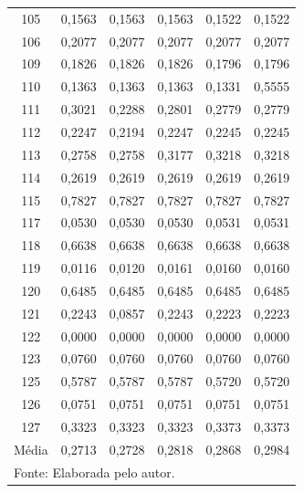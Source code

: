 \begin{center}
\begin{longtable}{c|r|r|r|r|r}
105 & 0,1563 & 0,1563 & 0,1563 & 0,1522 & 0,1522 \\

106 & 0,2077 & 0,2077 & 0,2077 & 0,2077 & 0,2077 \\

109 & 0,1826 & 0,1826 & 0,1826 & 0,1796 & 0,1796 \\

110 & 0,1363 & 0,1363 & 0,1363 & 0,1331 & 0,5555 \\

111 & 0,3021 & 0,2288 & 0,2801 & 0,2779 & 0,2779 \\

112 & 0,2247 & 0,2194 & 0,2247 & 0,2245 & 0,2245 \\

113 & 0,2758 & 0,2758 & 0,3177 & 0,3218 & 0,3218 \\

114 & 0,2619 & 0,2619 & 0,2619 & 0,2619 & 0,2619 \\

115 & 0,7827 & 0,7827 & 0,7827 & 0,7827 & 0,7827 \\

117 & 0,0530 & 0,0530 & 0,0530 & 0,0531 & 0,0531 \\

118 & 0,6638 & 0,6638 & 0,6638 & 0,6638 & 0,6638 \\

119 & 0,0116 & 0,0120 & 0,0161 & 0,0160 & 0,0160 \\

120 & 0,6485 & 0,6485 & 0,6485 & 0,6485 & 0,6485 \\

121 & 0,2243 & 0,0857 & 0,2243 & 0,2223 & 0,2223 \\

122 & 0,0000 & 0,0000 & 0,0000 & 0,0000 & 0,0000 \\

123 & 0,0760 & 0,0760 & 0,0760 & 0,0760 & 0,0760 \\

125 & 0,5787 & 0,5787 & 0,5787 & 0,5720 & 0,5720 \\

126 & 0,0751 & 0,0751 & 0,0751 & 0,0751 & 0,0751 \\

127 & 0,3323 & 0,3323 & 0,3323 & 0,3373 & 0,3373 \\

Média & 0,2713 & 0,2728 & 0,2818 & 0,2868 & 0,2984 \\



\hline
\hline \multicolumn{6}{l}{Fonte: Elaborada pelo autor.}

\end{longtable}
\end{center}





